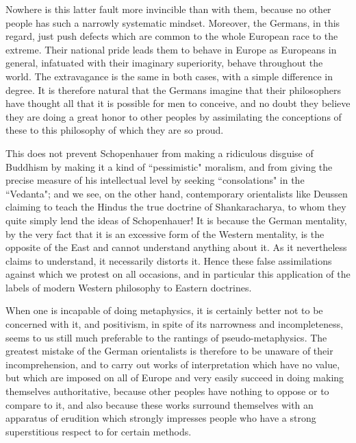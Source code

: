 Nowhere is this latter fault more invincible than with them, because no other people has such a narrowly systematic mindset. Moreover, the Germans, in this regard, just push defects which are common to the whole European race to the extreme. Their national pride leads them to behave in Europe as Europeans in general, infatuated with their imaginary superiority, behave throughout the world. The extravagance is the same in both cases, with a simple difference in degree. It is therefore natural that the Germans imagine that their philosophers have thought all that it is possible for men to conceive, and no doubt they believe they are doing a great honor to other peoples by assimilating the conceptions of these to this philosophy of which they are so proud.

This does not prevent Schopenhauer from making a ridiculous disguise of Buddhism by making it a kind of ``pessimistic" moralism, and from giving the precise measure of his intellectual level by seeking ``consolations" in the ``Vedanta"; and we see, on the other hand, contemporary orientalists like Deussen claiming to teach the Hindus the true doctrine of Shankaracharya, to whom they quite simply lend the ideas of Schopenhauer! It is because the German mentality, by the very fact that it is an excessive form of the Western mentality, is the opposite of the East and cannot understand anything about it. As it nevertheless claims to understand, it necessarily distorts it. Hence these false assimilations against which we protest on all occasions, and in particular this application of the labels of modern Western philosophy to Eastern doctrines.

When one is incapable of doing metaphysics, it is certainly better not to be concerned with it, and positivism, in spite of its narrowness and incompleteness, seems to us still much preferable to the rantings of pseudo-metaphysics. The greatest mistake of the German orientalists is therefore to be unaware of their incomprehension, and to carry out works of interpretation which have no value, but which are imposed on all of Europe and very easily succeed in doing making themselves authoritative, because other peoples have nothing to oppose or to compare to it, and also because these works surround themselves with an apparatus of erudition which strongly impresses people who have a strong superstitious respect to for certain methods.

